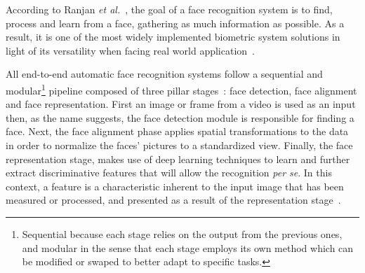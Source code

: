 \documentclass[class=report, crop=false, a4paper, 12pt]{standalone}
\begin{document}
\par According to Ranjan \textit{et al.}~\autocite{ranjanDeepLearningUnderstanding2018}, the goal of a face recognition system is to find, process and learn from a face, gathering as much information as possible. As a result, it is one of the most widely implemented biometric system solutions in light of its versatility when facing real world application~\autocite{duElementsEndtoendDeep2022}.

\par All end-to-end automatic face recognition systems follow a sequential and modular\footnote{Sequential because each stage relies on the output from the previous ones, and modular in the sense that each stage employs its own method which can be modified or swaped to better adapt to specific tasks.} pipeline  composed of three pillar stages~\autocite{wangDeepFaceRecognition2021}: face detection, face alignment and face representation. First an image or frame from a video is used as an input then, as the name suggests, the face detection module is responsible for finding a face. Next, the face alignment phase applies spatial transformations to the data in order to normalize the faces' pictures to a standardized view. Finally, the face representation stage, makes use of deep learning techniques to learn and further extract discriminative features that will allow the recognition \textit{per se}. In this context, a feature is a characteristic inherent to the input image that has been measured or processed, and presented as a result of the representation stage~\autocite{Goodfellow-et-al-2016}.
\end{document}
